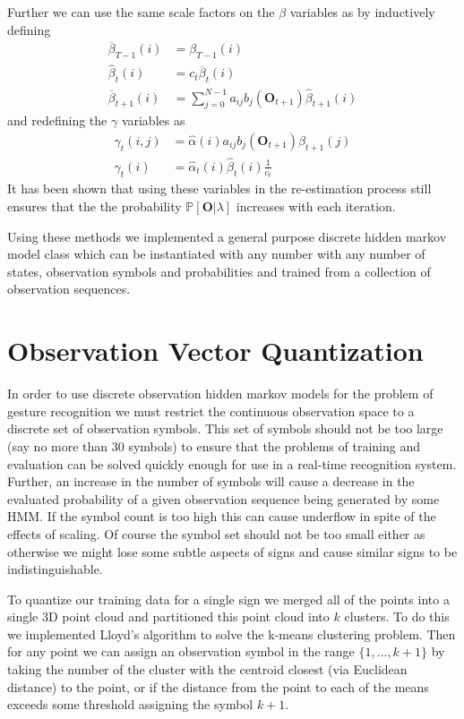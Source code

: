 Further we can use the same scale factors on the $\beta$ variables as by inductively defining
\begin{align*}
\overline{\beta}_{T-1}(i) &= \beta_{T-1}(i) \\
\hat{\beta}_{t}(i) &= c_t\overline{\beta}_t(i)\\
\overline{\beta}_{t+1}(i) &= \sum_{j=0}^{N-1}a_{ij}b_j(\mathbf{O}_{t+1})\hat{\beta}_{t+1}(i)
\end{align*}
and redefining the $\gamma$ variables as
\begin{align*}
\gamma_t(i,j)&=\hat{\alpha}(i)a_{ij}b_j(\mathbf{O}_{t+1})\beta_{t+1}(j)\\
\gamma_t(i) &= \hat{\alpha}_t(i)\hat{\beta}_t(i)\frac{1}{c_t}
\end{align*}
It has been shown that using these variables in the re-estimation process still ensures that the the probability $\mathbb{P}[\mathbf{O}|\lambda]$ increases with each iteration. 

Using these methods we implemented a general purpose discrete hidden markov model class which can be instantiated with any number with any number of states, observation symbols and probabilities and trained from a collection of observation sequences.
\section{Observation Vector Quantization}

In order to use discrete observation hidden markov models for the problem of gesture recognition we must restrict the continuous observation space to a discrete set of observation symbols. This set of symbols should not be too large (say no more than 30 symbols) to ensure that the problems of training and evaluation can be solved quickly enough for use in a real-time recognition system. Further, an increase in the number of symbols will cause a decrease in the evaluated probability of a given observation sequence being generated by some HMM. If the symbol count is too high this can cause underflow in spite of the effects of scaling. Of course the symbol set should not be too small either as otherwise we might lose some subtle aspects of signs and cause similar signs to be indistinguishable.

To quantize our training data for a single sign we merged all of the points  into a single 3D point cloud and partitioned this point cloud into $k$ clusters. To do this we implemented Lloyd's algorithm to solve the k-means clustering problem. Then for any point we can assign an observation symbol in the range $\{1,\dots,k+1\}$ by taking the number of the cluster with the centroid closest (via Euclidean distance) to the point, or if the distance from the point to each of the means exceeds some threshold assigning the symbol $k+1$. 

